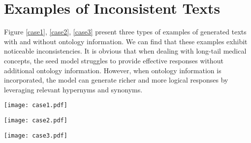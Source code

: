 \section{Examples of Inconsistent Texts}\label{app:d}
Figure \ref{case1}, \ref{case2}, \ref{case3} present three types of examples of generated texts with and without ontology information. We can find that these examples exhibit noticeable inconsistencies. It is obvious that when dealing with long-tail medical concepts, the seed model struggles to provide effective responses without additional ontology information. However, when ontology information is incorporated, the model can generate richer and more logical responses by leveraging relevant hypernyms and synonyms.



\begin{figure*}
\centering
\texttt{[image: case1.pdf]}
\caption{An Example of inconsistent diverse corpus.}
\label{case1}
\end{figure*}

\begin{figure*}
\centering
\texttt{[image: case2.pdf]}
\caption{An Example of inconsistent conceptual corpus.}
\label{case2}
\end{figure*}


\begin{figure*}
\centering
\texttt{[image: case3.pdf]}
\caption{An Example of inconsistent professional corpus.}
\label{case3}
\end{figure*}

